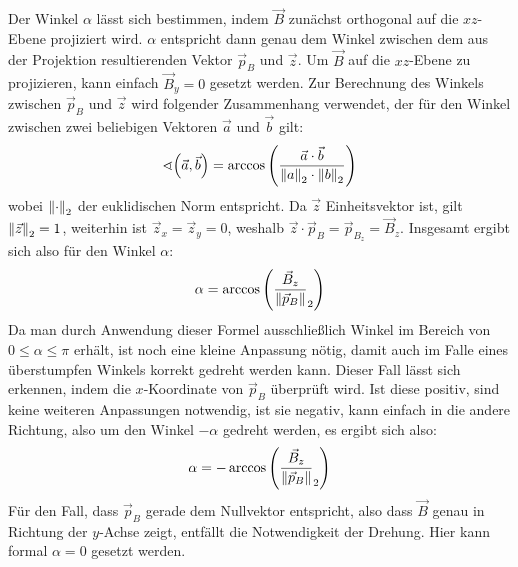 \noindent{}Der Winkel \(\alpha\) l\"asst sich bestimmen, indem \(\vec{B}\) zun\"achst orthogonal auf die \(xz\)-Ebene projiziert wird. \(\alpha\)
entspricht dann genau dem Winkel zwischen dem aus der Projektion resultierenden Vektor \(\vec{p}_B\) und \(\vec{z}\).
Um \(\vec{B}\) auf die \(xz\)-Ebene zu projizieren, kann einfach \(\vec{B}_y=0\) gesetzt werden. Zur Berechnung des Winkels
zwischen \(\vec{p}_B\) und \(\vec{z}\)
wird folgender Zusammenhang verwendet, der f\"ur den Winkel zwischen zwei beliebigen Vektoren \(\vec{a}\) und \(\vec{b}\) gilt:
\begin{equation}
  \sphericalangle{\left(\vec{a},\vec{b}\right)} = \arccos{\left(\frac{\vec{a} \cdot \vec{b}}{\left\lVert a\right\rVert_2 \cdot \left\lVert b\right\rVert_2}\right)}
\end{equation}
wobei \(\left\lVert\cdot\right\rVert_2\) der euklidischen Norm entspricht. Da \(\vec{z}\) Einheitsvektor ist, gilt \(\left\lVert\vec{z}\right\rVert_2 = 1\),
weiterhin ist
\(\vec{z}_x = \vec{z}_y = 0\), weshalb \(\vec{z} \cdot \vec{p}_B = \vec{p}_{B_z} = \vec{B}_z\). Insgesamt ergibt sich also f\"ur den
Winkel \(\alpha\):
\begin{equation}
  \label{eq:alpha}
  \alpha = \arccos{\left(\frac{\vec{B}_z}{\left\lVert\vec{p}_B\right\rVert}_2\right)}
\end{equation}
Da man durch Anwendung dieser Formel ausschlie{\ss}lich Winkel im Bereich von \(0 \leq \alpha \leq \pi\) erh\"alt, ist noch eine kleine
Anpassung n\"otig, damit auch im Falle eines \"uberstumpfen Winkels korrekt gedreht werden kann. Dieser Fall l\"asst sich erkennen,
indem die \(x\)-Koordinate von \(\vec{p}_B\) \"uberpr\"uft wird. Ist diese positiv, sind keine weiteren Anpassungen notwendig,
ist sie negativ, kann einfach in die andere Richtung, also um den Winkel \(-\alpha\) gedreht werden, es ergibt sich also:
\begin{equation}
  \alpha = -\arccos{\left(\frac{\vec{B}_z}{\left\lVert\vec{p}_B\right\rVert}_2\right)}
\end{equation}
F\"ur den Fall, dass \(\vec{p}_B\)
gerade dem Nullvektor entspricht, also dass \(\vec{B}\) genau in Richtung der \(y\)-Achse zeigt, entf\"allt die Notwendigkeit
der Drehung. Hier kann formal \(\alpha = 0\) gesetzt werden.

